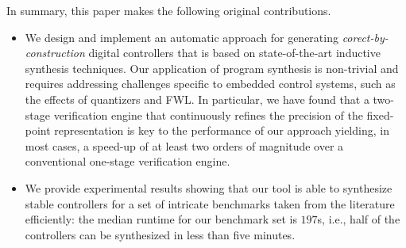 \documentclass{sig-alternate-05-2015}
\begin{document}
In summary, this paper makes the following original contributions.
%
\begin{itemize}

\item We design and implement an automatic approach for generating
  {\em corect-by-construction} digital controllers that is based on
  state-of-the-art inductive synthesis techniques.  Our application of
  program synthesis is non-trivial and requires addressing challenges
  specific to embedded control systems, such as the effects of quantizers and
  FWL. In particular, we have found that a two-stage verification engine
  that continuously refines the precision of the fixed-point
  representation is key to the performance of our approach yielding,
  in most cases, a speed-up of at least two orders of magnitude over a
  conventional one-stage verification engine.

\item We provide experimental results showing that our tool is able to
synthesize stable controllers for a set of intricate benchmarks taken from
the literature efficiently: the median runtime for our benchmark set is
$197$s, i.e., half of the controllers can be synthesized in less than five
minutes.




\end{itemize}


\end{document}
